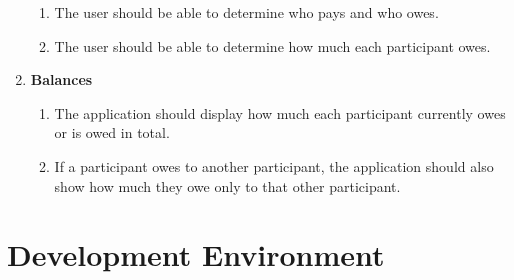 \documentclass[conference]{IEEEtran}
\begin{document}
\begin{enumerate}
\begin{enumerate}
            \item The user should be able to determine who pays and who owes.
            \item The user should be able to determine how much each participant owes.
        \end{enumerate}
    \item \textbf{Balances}
        \begin{enumerate}
            \item The application should display how much each participant currently owes or is owed in total.
            \item If a participant owes to another participant, the application should also show how much they owe only to that other participant.
        \end{enumerate}
\end{enumerate}

\section{Development Environment}
\end{document}
